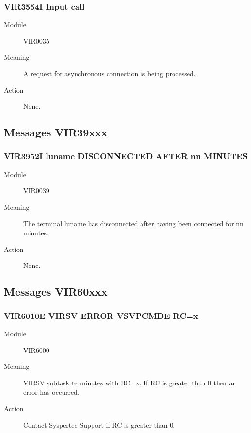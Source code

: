 \documentclass[letterpaper,10pt,english]{sphinxmanual}
\begin{document}
\subsubsection{VIR3554I Input call}
\label{\detokenize{messages:vir3554i-input-call}}\begin{description}
\item[{Module}] \leavevmode
VIR0035

\item[{Meaning}] \leavevmode
A request for asynchronous connection is being processed.

\item[{Action}] \leavevmode
None.

\end{description}


\subsection{Messages VIR39xxx}
\label{\detokenize{messages:messages-vir39xxx}}

\subsubsection{VIR3952I luname DISCONNECTED AFTER nn MINUTES}
\label{\detokenize{messages:vir3952i-luname-disconnected-after-nn-minutes}}\begin{description}
\item[{Module}] \leavevmode
VIR0039

\item[{Meaning}] \leavevmode
The terminal luname has disconnected after having been connected for nn minutes.

\item[{Action}] \leavevmode
None.

\end{description}


\subsection{Messages VIR60xxx}
\label{\detokenize{messages:messages-vir60xxx}}

\subsubsection{VIR6010E VIRSV ERROR VSVPCMDE RC=x}
\label{\detokenize{messages:vir6010e-virsv-error-vsvpcmde-rc-x}}\begin{description}
\item[{Module}] \leavevmode
VIR6000

\item[{Meaning}] \leavevmode
VIRSV subtask terminates with RC=x. If RC is greater than 0 then an error has occurred.

\item[{Action}] \leavevmode
Contact Syspertec Support if RC is greater than 0.

\end{description}
\end{document}
